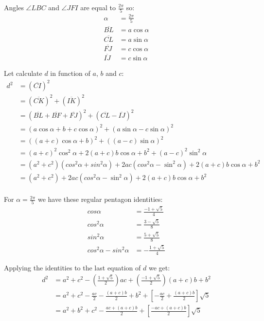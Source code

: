 \documentclass[11pt]{article}
\begin{document}
Angles $\angle{LBC}$ and $\angle{JFI}$ are equal to $\frac{2\pi}{5}$ so:
\begin{align*}
\alpha &= \frac{2\pi}{5}\\
\overline{BL} &= a\cos{\alpha}\\
\overline{CL} &= a\sin{\alpha}\\
\overline{FJ} &= c\cos{\alpha}\\
\overline{IJ} &= c\sin{\alpha}
\end{align*}

Let calculate $d$ in function of $a$, $b$ and $c$:
\begin{align*}
d^2 &= (\overline{CI})^2\\
    &= (\overline{CK})^2 + (\overline{IK})^2\\
    &= (\overline{BL} + \overline{BF} + \overline{FJ})^2 + (\overline{CL} - \overline{IJ})^2\\
    &= (a\cos{\alpha} + b + c\cos{\alpha})^2 + (a\sin{\alpha} - c\sin{\alpha})^2\\
    &= ((a+c)\cos{\alpha} + b)^2 + ((a-c)\sin{\alpha})^2\\
    &= (a+c)^2\cos^2{\alpha} + 2(a+c)b\cos{\alpha} + b^2 + (a-c)^2\sin^2{\alpha}\\
    &= (a^2+c^2)(cos^2{\alpha}+sin^2{\alpha}) + 2ac(cos^2{\alpha}-\sin^2{\alpha})+ 2(a+c)b\cos{\alpha} + b^2\\
    &= (a^2+c^2) + 2ac(cos^2{\alpha}-\sin^2{\alpha})+ 2(a+c)b\cos{\alpha} + b^2\\
\end{align*}

For $\alpha = \frac{2\pi}{5}$ we have these regular pentagon identities:
\begin{align*}
cos{\alpha}   &= \frac{-1 + \sqrt{5}}{4} \\
cos^2{\alpha} &= \frac{{ 3 - \sqrt{5}}}{8} \\
sin^2{\alpha} &= \frac{5 + \sqrt{5}}{8} \\
cos^2{\alpha} - sin^2{\alpha} &= -\frac{1 + \sqrt{5}}{4}
\end{align*}

Applying the identities to the last equation of $d$ we get:
\begin{align*}
d^2 &= a^2 + c^2 - (\frac{1 + \sqrt{5}}{2})ac + (\frac{-1 + \sqrt{5}}{2})(a+c)b + b^2\\
    &= a^2 + c^2 - \frac{ac}{2} - \frac{(a+c)b}{2} + b^2 + [- \frac{ac}{2} + \frac{(a+c)b}{2}]\sqrt{5}\\
    &= a^2 + b^2 + c^2 - \frac{ac + (a+c)b}{2} + [\frac{-ac + (a+c)b}{2}]\sqrt{5}
\end{align*}
\end{document}
